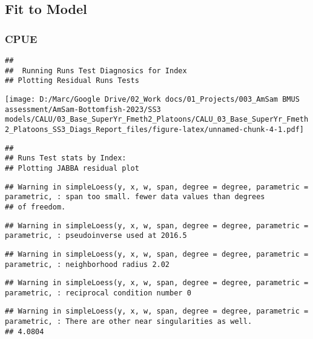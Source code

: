 \documentclass[
]{article}
\begin{document}
\hypertarget{fit-to-model}{%
\subsection{Fit to Model}\label{fit-to-model}}

\hypertarget{cpue}{%
\subsubsection{CPUE}\label{cpue}}

\begin{verbatim}
## 
##  Running Runs Test Diagnosics for Index 
## Plotting Residual Runs Tests
\end{verbatim}

\texttt{[image: D:/Marc/Google Drive/02\_Work docs/01\_Projects/003\_AmSam BMUS assessment/AmSam-Bottomfish-2023/SS3 models/CALU/03\_Base\_SuperYr\_Fmeth2\_Platoons/CALU\_03\_Base\_SuperYr\_Fmeth2\_Platoons\_SS3\_Diags\_Report\_files/figure-latex/unnamed-chunk-4-1.pdf]}

\begin{verbatim}
## 
## Runs Test stats by Index:
## Plotting JABBA residual plot
\end{verbatim}

\begin{verbatim}
## Warning in simpleLoess(y, x, w, span, degree = degree, parametric = parametric, : span too small. fewer data values than degrees
## of freedom.
\end{verbatim}

\begin{verbatim}
## Warning in simpleLoess(y, x, w, span, degree = degree, parametric = parametric, : pseudoinverse used at 2016.5
\end{verbatim}

\begin{verbatim}
## Warning in simpleLoess(y, x, w, span, degree = degree, parametric = parametric, : neighborhood radius 2.02
\end{verbatim}

\begin{verbatim}
## Warning in simpleLoess(y, x, w, span, degree = degree, parametric = parametric, : reciprocal condition number 0
\end{verbatim}

\begin{verbatim}
## Warning in simpleLoess(y, x, w, span, degree = degree, parametric = parametric, : There are other near singularities as well.
## 4.0804
\end{verbatim}
\end{document}
